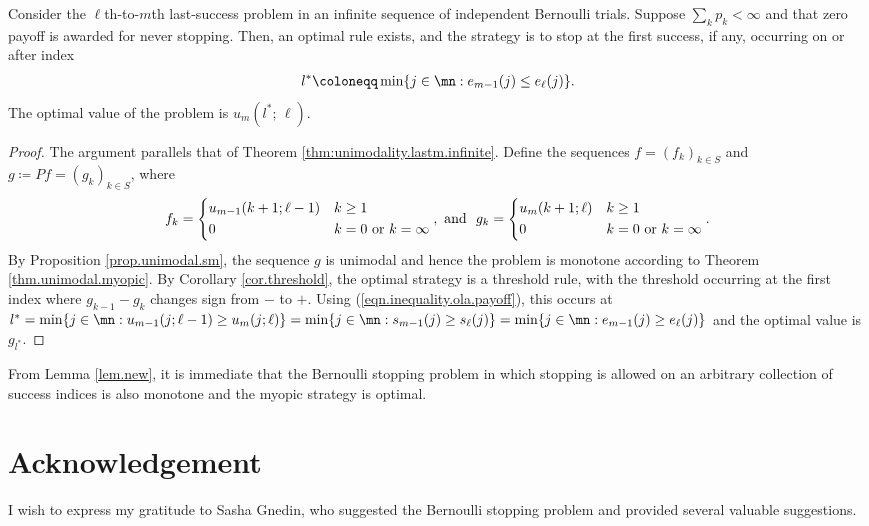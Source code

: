 \documentclass[11pt]{article}
\begin{document}
\begin{thm}\label{thm:existence.any_l_to_m}
	Consider the {$\ell$th-to-$m$th  last-success} problem in an infinite sequence of independent Bernoulli trials. Suppose $\sum_k p_k < \infty$ and that zero payoff is awarded for never stopping. Then, an optimal rule exists, and the  strategy is to stop at the first success, if any, occurring on or after index 
	\begin{alignat}{2} \label{threshold.mth}
		l^* \coloneqq \min\{j \in \mn: e_{m-1}(j) \le  e_{\ell}(j)\}.
	\end{alignat}
	The optimal value of the problem is \( u_m(l^*;\, \ell) \).
\end{thm}

\begin{proof}
	The argument parallels that of Theorem \ref{thm:unimodality.lastm.infinite}. 	Define the sequences  $f=(f_k)_{ k \in S}$ and $g\coloneqq Pf=(g_k)_{ k \in S}$, where 
	$$
	f_k = \begin{dcases}
		u_{m-1}(k+1; \ell-1) & k \ge 1 \\
		0 & k=0 \text{ or } k = \infty
	\end{dcases}, \text{ and }~
	g_k = \begin{dcases}
		u_{m}(k+1; \ell) & k \ge 1 \\
		0 & k=0 \text{ or } k = \infty
	\end{dcases}.
	$$
	By Proposition \ref{prop.unimodal.sm}, the sequence $g$ is unimodal and hence  the problem is monotone according to Theorem \ref{thm.unimodal.myopic}. By Corollary \ref{cor.threshold},  the optimal strategy is a threshold rule, with the threshold  occurring at the first index where  $g_{k-1} - g_k$ changes sign from $-$ to $+$. Using (\ref{eqn.inequality.ola.payoff}),  this occurs at  $l^*= \min \{ j \in \mn: u_{m-1}(j; \ell-1) \ge u_{m}(j; \ell)\} = \min \{ j \in \mn: s_{m-1}(j) \ge s_{\ell}(j)\} = \min \{ j \in \mn: e_{m-1}(j) \ge e_{\ell}(j)\}$ and the optimal value is $g_{l^*}$.
\end{proof}

\begin{rem}
From Lemma \ref{lem.new}, it is immediate that the Bernoulli stopping problem in which stopping is allowed on an arbitrary collection of success indices is also monotone and the myopic strategy is optimal.
\end{rem}


\section*{Acknowledgement}
I wish to express my gratitude to Sasha Gnedin, who suggested the Bernoulli stopping problem and provided several valuable suggestions. 
\printbibliography
\end{document}
